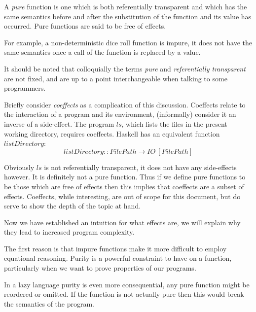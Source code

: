 \begin{definition}
    A \textit{pure} function is one which is both
    referentially transparent and which has the same semantics
    before and after the substitution of the function and its value
    has occurred. Pure functions are said to be free of effects.

    For example,
    a non-deterministic dice roll function is impure,
    it does not have the same semantics
    once a call of the function is replaced by a value.
\end{definition}

It should be noted that colloquially
the terms \textit{pure} and \textit{referentially transparent} are not fixed,
and are up to a point interchangeable when talking to some programmers.

Briefly consider \textit{coeffects} as a complication of this discussion.
Coeffects relate to the interaction of a program and its environment\cite{petricek2014coeffects},
(informally) consider it an inverse of a side-effect.
The program $ls$, which lists the files in the present working directory,
requires coeffects.
Haskell has an equivalent function $listDirectory$:
\begin{equation}
    listDirectory :: FilePath \rightarrow IO\ [FilePath]
\end{equation}

Obviously $ls$ is not referentially transparent,
it does not have any side-effects however.
It is definitely not a pure function.
Thus if we define pure functions to be those
which are free of effects then this
implies that coeffects are a subset of effects.
Coeffects, while interesting, are out of scope for this document,
but do serve to show the depth of the topic at hand.

Now we have established an intuition for what effects are,
we will explain why they lead to increased program complexity.

The first reason is that impure functions make it more
difficult to employ equational reasoning.
Purity is a powerful constraint to have on a function,
particularly when we want to prove properties of
our programs\cite{backus2007can}.

In a lazy language purity is even more consequential,
any pure function might be reordered or omitted.
If the function is not actually pure then this would
break the semantics of the program.

